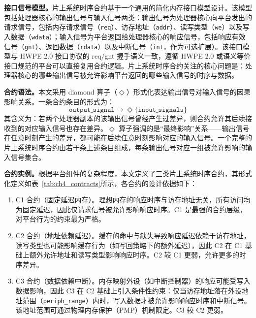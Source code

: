 \textbf{接口信号模型。}片上系统时序合约基于一个通用的简化内存接口模型设计。该模型包括处理器核心的输出信号与输入信号两类：输出信号为处理器核心向平台发出的请求信号，包括内存请求信号（\texttt{req}）、访存地址（\texttt{addr}）、读写类型（\texttt{we}）以及写入数据（\texttt{wdata}）；输入信号为平台返回给处理器核心的响应信号，包括响应有效信号（\texttt{gnt}）、返回数据（\texttt{rdata}）以及中断信号（\texttt{int}，作为可选扩展）。该接口模型与 HWPE 2.0 接口协议的 req/gnt 握手语义一致，遵循 HWPE 2.0 或语义等价接口规范的平台可以直接复用合约逻辑。片上系统时序合约关注的核心问题是：处理器核心的哪些输出信号被允许影响平台返回的哪些输入信号的时序与数据。

\textbf{合约语法。}本文采用 diamond 算子（$\Diamond$）形式化表达输出信号对输入信号的因果影响关系。一条合约条目的形式为：
\begin{equation}
    \texttt{output\_signal} \rightarrow \Diamond\{\texttt{input\_signals}\}
    \label{eq:ch4_diamond}
\end{equation}
其含义为：若两个处理器副本的该输出信号曾经产生过差异，则合约允许其后续接收到的对应输入信号也存在差异。$\Diamond$ 算子强调的是``最终影响''关系——输出信号在任意时刻产生的差异，都可能在后续任意时刻影响对应的输入信号。一个完整的片上系统时序合约由若干条上述条目组成，每条输出信号对应一组被允许影响的输入信号集合。

\textbf{合约实例。}根据平台组件的复杂程度，本文定义了三类片上系统时序合约，其形式化定义如表~\ref{tab:ch4_contracts}所示，各合约的设计依据如下：

\begin{enumerate}
    \item C1 合约（固定延迟内存）。理想内存的响应时序与访存地址无关，所有访问均为固定延迟，因此仅请求信号被允许影响响应时序。C1 是最强的合约层级，对平台行为的约束最为严格。
    \item C2 合约（地址依赖延迟）。缓存的命中与缺失导致响应延迟依赖于访存地址，读写类型也可能影响缓存行为（如写回策略下的额外延迟），因此 C2 在 C1 基础上额外允许地址和读写类型影响响应时序。C2 较 C1 更弱，允许更多的时序差异。
    \item C3 合约（数据依赖中断）。内存映射外设（如中断控制器）的响应可能受写入数据影响，因此 C3 在 C2 基础上引入条件性约束：仅当访存地址落在外设地址范围（\texttt{periph\_range}）内时，写入数据才被允许影响响应时序和中断信号。该地址范围可通过物理内存保护（PMP）机制限定。C3 较 C2 更弱。
\end{enumerate}

